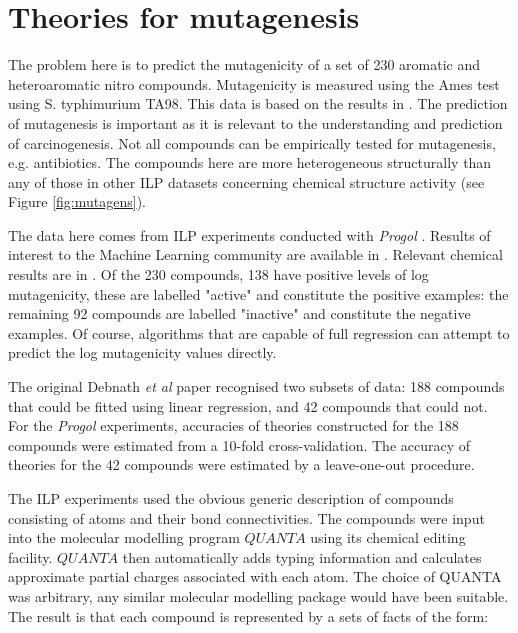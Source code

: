 


\section*{Theories for mutagenesis}
The problem here is to predict the mutagenicity of a set of 230 aromatic
and heteroaromatic nitro compounds.  Mutagenicity is measured using
the Ames test using S. typhimurium TA98.  This data is based on the
results in \cite{hansch:carcin}. The prediction of mutagenesis is
important as it is relevant to the understanding and prediction of carcinogenesis.
Not all compounds can be empirically tested for mutagenesis, e.g. antibiotics.
The compounds here are more heterogeneous structurally
than any of those in other ILP datasets concerning
chemical structure activity (see Figure \ref{fig:mutagens}).

\begin{figure*}[htb]
\textheight
\centerline{}
\caption{Examples of compounds
used in the mutagenesis study. (A) 3,4,4'-tri\-nitro\-biphenyl
(B) 2-nitro-1,3,7,8-tetrachlorodibenzo-1,4-dioxin (C) 1,6,-dinitro-9,10,11,12-tetrahydrobenzo[e]pyrene (D) nitrofurantoin
}
\label{fig:mutagens}
\end{figure*}


The data here comes from ILP experiments conducted with
{\em Progol\/} \cite{mugg:progol}. Results of interest to the Machine
Learning community are available in \cite{ashmugg:ilp94,ashmugg:tr895,ashmugg:tr995}.
Relevant chemical results are in \cite{kingmugg:jacs}.
Of the 230 compounds, 138 have positive levels of log mutagenicity,
these are labelled "active" and constitute the positive examples: the
remaining 92 compounds are labelled "inactive" and constitute the negative
examples.
Of course, algorithms that are capable of full regression
can attempt to predict the log mutagenicity values directly.

The original Debnath {\em et al\/} paper recognised two subsets of data: 188
compounds that could be fitted using linear regression, and 42 compounds
that could not. 
For the {\em Progol\/} experiments, accuracies of theories constructed for
the 188 compounds were estimated from a 10-fold cross-validation.
The accuracy of theories for the 42 compounds were estimated by a leave-one-out
procedure. 

The ILP experiments used the obvious generic description of compounds
consisting of atoms and their bond connectivities.
The compounds were input into the molecular modelling program ${QUANTA}$
using its chemical editing facility.  $QUANTA$ then automatically
adds typing information and calculates approximate partial charges associated
with each atom.  The choice of QUANTA
was arbitrary, any similar molecular modelling package would have been
suitable. The result is that each compound is represented by a sets of
facts of the form:

